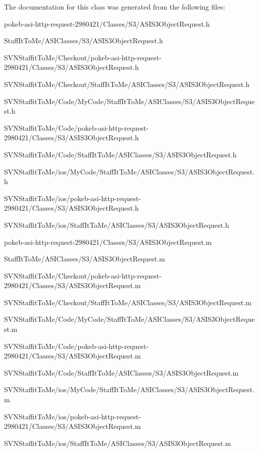 \-The documentation for this class was generated from the following files\-:\begin{DoxyCompactItemize}
\item 
pokeb-\/asi-\/http-\/request-\/2980421/\-Classes/\-S3/\-A\-S\-I\-S3\-Object\-Request.\-h\item 
\-Staff\-It\-To\-Me/\-A\-S\-I\-Classes/\-S3/\-A\-S\-I\-S3\-Object\-Request.\-h\item 
\-S\-V\-N\-Staffit\-To\-Me/\-Checkout/pokeb-\/asi-\/http-\/request-\/2980421/\-Classes/\-S3/\-A\-S\-I\-S3\-Object\-Request.\-h\item 
\-S\-V\-N\-Staffit\-To\-Me/\-Checkout/\-Staff\-It\-To\-Me/\-A\-S\-I\-Classes/\-S3/\-A\-S\-I\-S3\-Object\-Request.\-h\item 
\-S\-V\-N\-Staffit\-To\-Me/\-Code/\-My\-Code/\-Staff\-It\-To\-Me/\-A\-S\-I\-Classes/\-S3/\-A\-S\-I\-S3\-Object\-Request.\-h\item 
\-S\-V\-N\-Staffit\-To\-Me/\-Code/pokeb-\/asi-\/http-\/request-\/2980421/\-Classes/\-S3/\-A\-S\-I\-S3\-Object\-Request.\-h\item 
\-S\-V\-N\-Staffit\-To\-Me/\-Code/\-Staff\-It\-To\-Me/\-A\-S\-I\-Classes/\-S3/\-A\-S\-I\-S3\-Object\-Request.\-h\item 
\-S\-V\-N\-Staffit\-To\-Me/ios/\-My\-Code/\-Staff\-It\-To\-Me/\-A\-S\-I\-Classes/\-S3/\-A\-S\-I\-S3\-Object\-Request.\-h\item 
\-S\-V\-N\-Staffit\-To\-Me/ios/pokeb-\/asi-\/http-\/request-\/2980421/\-Classes/\-S3/\-A\-S\-I\-S3\-Object\-Request.\-h\item 
\-S\-V\-N\-Staffit\-To\-Me/ios/\-Staff\-It\-To\-Me/\-A\-S\-I\-Classes/\-S3/\-A\-S\-I\-S3\-Object\-Request.\-h\item 
pokeb-\/asi-\/http-\/request-\/2980421/\-Classes/\-S3/\-A\-S\-I\-S3\-Object\-Request.\-m\item 
\-Staff\-It\-To\-Me/\-A\-S\-I\-Classes/\-S3/\-A\-S\-I\-S3\-Object\-Request.\-m\item 
\-S\-V\-N\-Staffit\-To\-Me/\-Checkout/pokeb-\/asi-\/http-\/request-\/2980421/\-Classes/\-S3/\-A\-S\-I\-S3\-Object\-Request.\-m\item 
\-S\-V\-N\-Staffit\-To\-Me/\-Checkout/\-Staff\-It\-To\-Me/\-A\-S\-I\-Classes/\-S3/\-A\-S\-I\-S3\-Object\-Request.\-m\item 
\-S\-V\-N\-Staffit\-To\-Me/\-Code/\-My\-Code/\-Staff\-It\-To\-Me/\-A\-S\-I\-Classes/\-S3/\-A\-S\-I\-S3\-Object\-Request.\-m\item 
\-S\-V\-N\-Staffit\-To\-Me/\-Code/pokeb-\/asi-\/http-\/request-\/2980421/\-Classes/\-S3/\-A\-S\-I\-S3\-Object\-Request.\-m\item 
\-S\-V\-N\-Staffit\-To\-Me/\-Code/\-Staff\-It\-To\-Me/\-A\-S\-I\-Classes/\-S3/\-A\-S\-I\-S3\-Object\-Request.\-m\item 
\-S\-V\-N\-Staffit\-To\-Me/ios/\-My\-Code/\-Staff\-It\-To\-Me/\-A\-S\-I\-Classes/\-S3/\-A\-S\-I\-S3\-Object\-Request.\-m\item 
\-S\-V\-N\-Staffit\-To\-Me/ios/pokeb-\/asi-\/http-\/request-\/2980421/\-Classes/\-S3/\-A\-S\-I\-S3\-Object\-Request.\-m\item 
\-S\-V\-N\-Staffit\-To\-Me/ios/\-Staff\-It\-To\-Me/\-A\-S\-I\-Classes/\-S3/\-A\-S\-I\-S3\-Object\-Request.\-m\end{DoxyCompactItemize}
